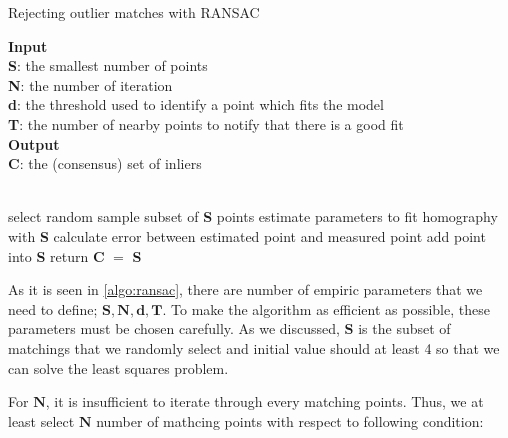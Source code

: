 \documentclass[a4paper]{report}
\numberwithin{figure}{section}
\begin{document}
\begin{algorithm}[H]
  \caption{Rejecting outlier matches with RANSAC}\label{algo_ransac}

  \textbf{Input} \\
    \hspace*{\algorithmicindent}\textbf{S}: the smallest number of points\\
    \hspace*{\algorithmicindent}\textbf{N}: the number of iteration\\
    \hspace*{\algorithmicindent}\textbf{d}: the threshold used to identify a point which fits the model\\
    \hspace*{\algorithmicindent}\textbf{T}: the number of nearby points to notify that there is a good fit\\
  \textbf{Output} \\
    \hspace*{\algorithmicindent}\textbf{C}: the (consensus) set of inliers \\
  \begin{algorithmic}[1]

    \\
      \State select random sample subset of \textbf{S} points
      \State estimate parameters to fit homography with \textbf{S}
        \State calculate error between estimated point and measured point
          \State add point into \textbf{S}
        \EndIf
          \State return \textbf{C} $=$ \textbf{S}
        \EndIf
      \EndFor
      \EndWhile
    \EndProcedure
  \end{algorithmic}

\end{algorithm} \label{algo:ransac}

As it is seen in \ref{algo:ransac}, there are number of empiric parameters 
that we need to define; $\mathbf{S,N,d,T}$. To make the algorithm as 
efficient as possible, these parameters must be chosen carefully. As we 
discussed, $\mathbf{S}$ is the subset of matchings that we randomly select and 
initial value should at least 4 so that we can solve the least 
squares problem. 

For $\mathbf{N}$, it is insufficient to iterate 
through every matching points. Thus, we at least select $\mathbf{N}$ 
number of mathcing points with respect to following condition:
\end{document}
